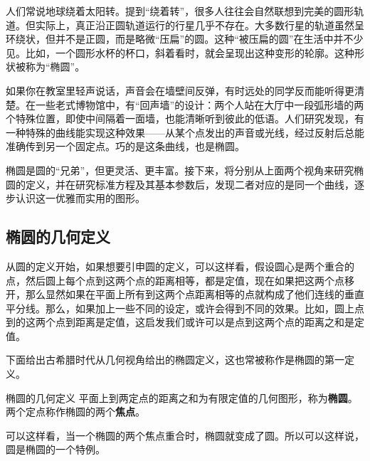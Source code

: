 
\begin{issues}
\issueDraft
\end{issues}



人们常说地球绕着太阳转。提到“绕着转”，很多人往往会自然联想到完美的圆形轨道。但实际上，真正沿正圆轨道运行的行星几乎不存在。大多数行星的轨道虽然呈环绕状，但并不是正圆，而是略微“压扁”的圆。这种“被压扁的圆”在生活中并不少见。比如，一个圆形水杯的杯口，斜着看时，就会呈现出这种变形的轮廓。这种形状被称为“椭圆”。

如果你在教室里轻声说话，声音会在墙壁间反弹，有时远处的同学反而能听得更清楚。在一些老式博物馆中，有“回声墙”的设计：两个人站在大厅中一段弧形墙的两个特殊位置，即使中间隔着一面墙，也能清晰听到彼此的低语。人们研究发现，有一种特殊的曲线能实现这种效果——从某个点发出的声音或光线，经过反射后总能准确传到另一个固定点。巧的是这条曲线，也是椭圆。

椭圆是圆的“兄弟”，但更灵活、更丰富。接下来，将分别从上面两个视角来研究椭圆的定义，并在研究标准方程及其基本参数后，发现二者对应的是同一个曲线，逐步认识这一优雅而实用的图形。

\subsection{椭圆的几何定义}

从圆的定义开始，如果想要引申圆的定义，可以这样看，假设圆心是两个重合的点，然后圆上每个点到这两个点的距离相等，都是定值，现在如果把这两个点移开，那么显然如果在平面上所有到这两个点距离相等的点就构成了他们连线的垂直平分线。那么，如果加上一些不同的设定，或许会得到不同的效果。比如，圆上点到的这两个点到距离是定值，这启发我们或许可以是点到这两个点的距离之和是定值。

下面给出古希腊时代从几何视角给出的椭圆定义，这也常被称作是椭圆的第一定义。

\begin{definition}{椭圆的几何定义}
平面上到两定点的距离之和为有限定值的几何图形，称为\textbf{椭圆}。两个定点称作椭圆的两个\textbf{焦点}。
\end{definition}

可以这样看，当一个椭圆的两个焦点重合时，椭圆就变成了圆。所以可以这样说，圆是椭圆的一个特例。

